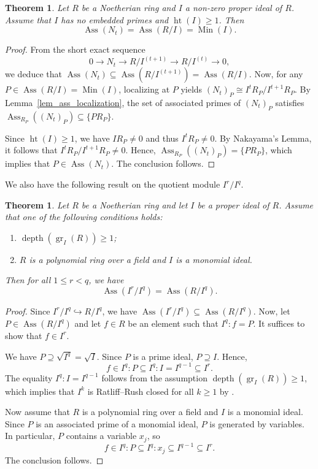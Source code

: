 \documentclass[12pt]{amsart}
\def\Min{\operatorname{Min}}
\def\Ass{\operatorname{Ass}}
\newtheorem{theorem}[lemma]{Theorem}
\begin{document}
\begin{theorem}\label{thm_ass_N} 
Let $R$ be a Noetherian ring and $I$ a non-zero proper ideal of $R$. Assume that $I$ has no embedded primes and $\operatorname{ht}(I) \ge 1$. Then 
$$\Ass(N_t) = \Ass(R/I) = \Min(I).$$
\end{theorem}
\begin{proof}
From the short exact sequence 
$$0 \to N_t \to R/I^{(t+1)} \to R/I^{(t)} \to 0,$$
we deduce that $\Ass(N_t) \subseteq \Ass(R/I^{(t+1)}) = \Ass(R/I)$. Now, for any $P \in \Ass(R/I) = \Min(I)$, localizing at $P$ yields $(N_t)_P \cong I^t R_P / I^{t+1} R_P$. By Lemma~\ref{lem_ass_localization}, the set of associated primes of $(N_t)_P$ satisfies $\Ass_{R_P}((N_t)_P) \subseteq \{ P R_P \}$. 

Since $\operatorname{ht}(I) \ge 1$, we have $I R_P \neq 0$ and thus $I^t R_P \neq 0$. By Nakayama's Lemma, it follows that $I^t R_P / I^{t+1} R_P \neq 0$. Hence, $\Ass_{R_P}((N_t)_P) = \{ P R_P \}$, which implies that $P \in \Ass(N_t)$. The conclusion follows.
\end{proof}

We also have the following result on the quotient module $I^r / I^q$.

\begin{theorem}\label{theorem_filtered_I}
Let $R$ be a Noetherian ring and let $I$ be a proper ideal of $R$. Assume that one of the following conditions holds:
\begin{enumerate}
    \item $\operatorname{depth}(\operatorname{gr}_I(R)) \ge 1$;
    \item $R$ is a polynomial ring over a field and $I$ is a monomial ideal.
\end{enumerate} 
Then for all $1 \le r < q$, we have 
$$\operatorname{Ass}(I^r / I^q) = \operatorname{Ass}(R / I^q).$$    
\end{theorem}

\begin{proof}
Since $I^r / I^q \hookrightarrow R / I^q$, we have $\operatorname{Ass}(I^r / I^q) \subseteq \operatorname{Ass}(R / I^q)$. Now, let $P \in \operatorname{Ass}(R / I^q)$ and let $f \in R$ be an element such that $I^q : f = P$. It suffices to show that $f \in I^r$. 

We have $P \supseteq \sqrt{I^q} = \sqrt{I}$. Since $P$ is a prime ideal, $P \supseteq I$. Hence,
$$f \in I^q : P \subseteq I^q : I = I^{q-1} \subseteq I^r.$$
The equality $I^q : I = I^{q-1}$ follows from the assumption $\operatorname{depth}(\operatorname{gr}_I(R)) \ge 1$, which implies that $I^k$ is Ratliff--Rush closed for all $k \ge 1$ by \cite[Lemma 3.10]{rv10}.

Now assume that $R$ is a polynomial ring over a field and $I$ is a monomial ideal. Since $P$ is an associated prime of a monomial ideal, $P$ is generated by variables. In particular, $P$ contains a variable $x_j$, so
$$f \in I^q : P \subseteq I^q : x_j \subseteq I^{q-1} \subseteq I^r.$$
The conclusion follows.
\end{proof}
\end{document}
